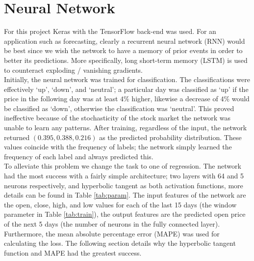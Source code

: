 \documentclass[12pt]{article}
\begin{document}
\section{Neural Network}

For this project Keras with the TensorFlow back-end was used. For an application such as forecasting, clearly a recurrent neural network (RNN) would be best since we wish the network to have a memory of prior events in order to better its predictions. More specifically, long short-term memory (LSTM) is used to counteract exploding / vanishing gradients. \\

Initially, the neural network was trained for classification. The classifications were effectively `up', `down', and `neutral'; a particular day was classified as `up' if the price in the following day was at least $4\%$ higher, likewise a decrease of $4\%$ would be classified as `down', otherwise the classification was `neutral'. This proved ineffective because of the stochasticity of the stock market the network was unable to learn any patterns. After training, regardless of the input, the network returned $(0.395, 0.388, 0.216)$ as the predicted probability distribution. These values coincide with the frequency of labels; the network simply learned the frequency of each label and always predicted this. \\

To alleviate this problem we change the task to one of regression. The network had the most success with a fairly simple architecture; two layers with 64 and 5 neurons respectively, and hyperbolic tangent as both activation functions, more details can be found in Table \ref{tab:param}. The input features of the network are the open, close, high, and low values for each of the last 15 days (the window parameter in Table \ref{tab:train}), the output features are the predicted open price of the next 5 days (the number of neurons in the fully connected layer). Furthermore, the mean absolute percentage error (MAPE) was used for calculating the loss. The following section details why the hyperbolic tangent function and MAPE had the greatest success.
\end{document}
